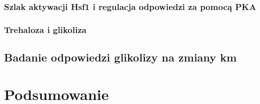 \documentclass{pracamgr}
\begin{document}
\subsection{Szlak aktywacji Hsf1 i regulacja odpowiedzi za pomocą PKA}
\subsection{Trehaloza i glikoliza}

\section{Badanie odpowiedzi glikolizy na zmiany km}



\chapter{Podsumowanie}





\end{document}
